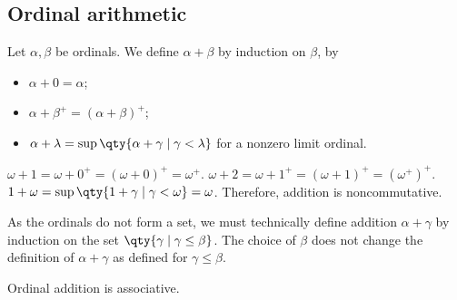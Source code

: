 \subsection{Ordinal arithmetic}
Let $\alpha, \beta$ be ordinals.
We define $\alpha + \beta$ by induction on $\beta$, by
\begin{itemize}
    \item $\alpha + 0 = \alpha$;
    \item $\alpha + \beta^+ = (\alpha + \beta)^+$;
    \item $\alpha + \lambda = \sup\qty{\alpha + \gamma \mid \gamma < \lambda}$ for a nonzero limit ordinal.
\end{itemize}
\begin{example}
    $\omega + 1 = \omega + 0^+ = (\omega + 0)^+ = \omega^+$.
    $\omega + 2 = \omega + 1^+ = (\omega + 1)^+ = (\omega^+)^+$.
    $1 + \omega = \sup\qty{1 + \gamma \mid \gamma < \omega} = \omega$.
    Therefore, addition is noncommutative.
\end{example}
\begin{remark}
    As the ordinals do not form a set, we must technically define addition $\alpha + \gamma$ by induction on the set $\qty{\gamma \mid \gamma \leq \beta}$.
    The choice of $\beta$ does not change the definition of $\alpha + \gamma$ as defined for $\gamma \leq \beta$.
\end{remark}
\begin{proposition}
    Ordinal addition is associative.
\end{proposition}
